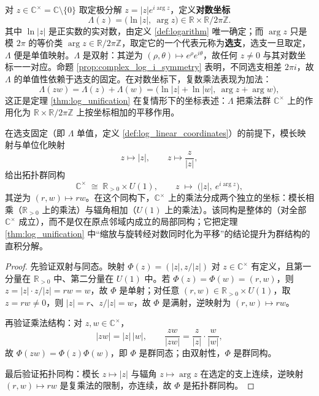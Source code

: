 \begin{definition}[对数坐标]\label{def:log_linear_coordinates}
对 $z\in\mathbb{C}^{\times}=\mathbb{C}\setminus\{0\}$ 取定极分解 $z=|z|e^{i\arg z}$，定义\textbf{对数坐标}
\[
\Lambda(z)=\bigl(\ln|z|,\ \arg z\bigr)\in\mathbb{R}\times\mathbb{R}/2\pi\mathbb{Z}.
\]
其中 $\ln|z|$ 是正实数的实对数，由定义 \ref{def:logarithm} 唯一确定；而 $\arg z$ 只是模 $2\pi$ 的等价类 $\arg z\in\mathbb{R}/2\pi\mathbb{Z}$，取定它的一个代表元称为\textbf{选支}，选支一旦取定，$\Lambda$ 便是单值映射。$\Lambda$ 是双射：其逆为 $(\rho,\theta)\mapsto e^{\rho}e^{i\theta}$，故任何 $z\neq0$ 与其对数坐标一一对应。命题 \ref{prop:complex_log_i_symmetry} 表明，不同选支相差 $2\pi i$，故 $\Lambda$ 的单值性依赖于选支的固定。在对数坐标下，复数乘法表现为加法：
\[
\Lambda(zw)=\Lambda(z)+\Lambda(w)=\bigl(\ln|z|+\ln|w|,\ \arg z+\arg w\bigr),
\]
这正是定理 \ref{thm:log_unification} 在复情形下的坐标表述：$\Lambda$ 把乘法群 $\mathbb{C}^{\times}$ 上的作用化为 $\mathbb{R}\times\mathbb{R}/2\pi\mathbb{Z}$ 上按坐标相加的平移作用。
\end{definition}

\begin{theorem}[复数乘法的解耦]\label{thm:complex_multiplication_decoupling}
在选支固定（即 $\Lambda$ 单值，定义 \ref{def:log_linear_coordinates}）的前提下，模长映射与单位化映射
\[
z\mapsto|z|,\qquad z\mapsto\frac{z}{|z|},
\]
给出拓扑群同构
\[
\mathbb{C}^{\times}\;\cong\;\mathbb{R}_{>0}\times U(1),\qquad
z\;\longmapsto\;\bigl(|z|,\ e^{i\arg z}\bigr),
\]
其逆为 $(r,w)\mapsto rw$。在这个同构下，$\mathbb{C}^{\times}$ 上的乘法分成两个独立的坐标：模长相乘（$\mathbb{R}_{>0}$ 上的乘法）与辐角相加（$U(1)$ 上的乘法）。该同构是整体的（对全部 $\mathbb{C}^{\times}$ 成立），而不是仅在原点邻域内成立的局部同构；它把定理 \ref{thm:log_unification} 中“缩放与旋转经对数同时化为平移”的结论提升为群结构的直积分解。
\end{theorem}

\begin{proof}
先验证双射与同态。映射 $\Phi(z)=(|z|,z/|z|)$ 对 $z\in\mathbb{C}^{\times}$ 有定义，且第一分量在 $\mathbb{R}_{>0}$ 中、第二分量在 $U(1)$ 中。若 $\Phi(z)=\Phi(w)=(r,w)$，则 $z=|z|\cdot z/|z|=rw=w$，故 $\Phi$ 是单射；对任意 $(r,w)\in\mathbb{R}_{>0}\times U(1)$，取 $z=rw\neq0$，则 $|z|=r$、$z/|z|=w$，故 $\Phi$ 是满射，逆映射为 $(r,w)\mapsto rw$。

再验证乘法结构：对 $z,w\in\mathbb{C}^{\times}$，
\[
|zw|=|z|\,|w|,\qquad \frac{zw}{|zw|}=\frac{z}{|z|}\cdot\frac{w}{|w|},
\]
故 $\Phi(zw)=\Phi(z)\Phi(w)$，即 $\Phi$ 是群同态；由双射性，$\Phi$ 是群同构。

最后验证拓扑同构：模长 $z\mapsto|z|$ 与辐角 $z\mapsto\arg z$ 在选定的支上连续，逆映射 $(r,w)\mapsto rw$ 是复乘法的限制，亦连续，故 $\Phi$ 是拓扑群同构。
\end{proof}

